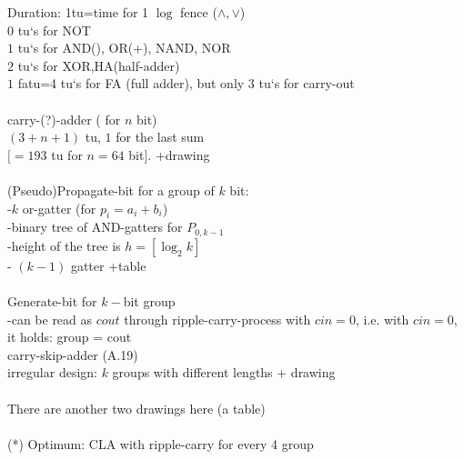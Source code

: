 \documentclass[a4paper, 11pt]{report}
\theoremstyle{break}
\theoremstyle{proofstyle}
\begin{document}
    Duration: 1tu=time for 1 $\log$ fence ($\land, \lor$) \\
    $0$ tu`s for NOT\\
    $1$ tu`s for AND(\cdot), OR(+), NAND, NOR\\
    $2$ tu`s for XOR,HA(half-adder)\\
    $1$ fatu=4 tu`s for FA (full adder), but only 3 tu`s for carry-out\\ 
    \\
    \impliesq carry-(?)-adder ( for $n$ bit)\\
    $(3+n+1)$ tu, $1$ for the last sum \\
    $[=193$ tu for $n=64$ bit$]$. +drawing \\
    \\
    (Pseudo)Propagate-bit for a group of $k$ bit:\\
    -$k$ or-gatter (for $p_i=a_i+b_i$) \\
    -binary tree of AND-gatters for $P_{0,k-1}$ \\
    -height of the tree is $h=[\log_2 k]$ \\
    - $(k-1)$ gatter +table\\
    \\
    Generate-bit for $k-$bit group \\
    -can be read as $cout$ through ripple-carry-process with $cin=0$, i.e. with $cin=0$, it holds: group = cout \\
    \to carry-skip-adder (A.19) \\
    irregular design: $k$ groups with different lengths + drawing \\
    \\ There are another two drawings here (a table) \\
    \\
    (*) Optimum: CLA with ripple-carry for every 4 group\\
\end{document}
